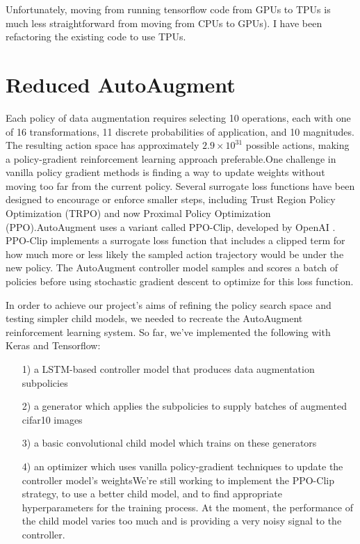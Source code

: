 \documentclass[10pt,twocolumn,letterpaper]{article}
\begin{document}
	Unfortunately, moving from running tensorflow code from GPUs to TPUs is much less straightforward from moving from CPUs to GPUs). I have been refactoring the existing code to use TPUs. 

\section{Reduced AutoAugment}

	Each policy of data augmentation requires selecting 10 operations, each with one of 16 transformations, 11 discrete probabilities of application, and 10 magnitudes.  The resulting action space has approximately $2.9 \times 10^{31}$ possible actions, making a policy-gradient reinforcement learning approach preferable.One challenge in vanilla policy gradient methods is finding a way to update weights without moving too far from the current policy. Several surrogate loss functions have been designed to encourage or enforce smaller steps, including Trust Region Policy Optimization (TRPO) and now Proximal Policy Optimization (PPO).AutoAugment uses a variant called PPO-Clip, developed by OpenAI \cite{Schulman2017}. PPO-Clip implements a surrogate loss function that includes a clipped term for how much more or less likely the sampled action trajectory would be under the new policy. The AutoAugment controller model samples and scores a batch of policies before using stochastic gradient descent to optimize for this loss function.
	
	In order to achieve our project's aims of refining the policy search space and testing simpler child models, we needed to recreate the AutoAugment reinforcement learning system. So far, we've implemented the following with Keras and Tensorflow:

	\begin{enumerate}
		\item[1)]
			a LSTM-based controller model that produces data augmentation subpolicies
		
		\item[2)]
			a generator which applies the subpolicies to supply batches of augmented cifar10 images
		
		\item[3)]
			a basic convolutional child model which trains on these generators
		
		\item[4)]
			an optimizer which uses vanilla policy-gradient techniques to update the controller model's weightsWe're still working to implement the PPO-Clip strategy, to use a better child model, and to find appropriate hyperparameters for the training process.    At the moment, the performance of the child model varies too much and is providing a very noisy signal to the controller.
			
	\end{enumerate}
\end{document}

